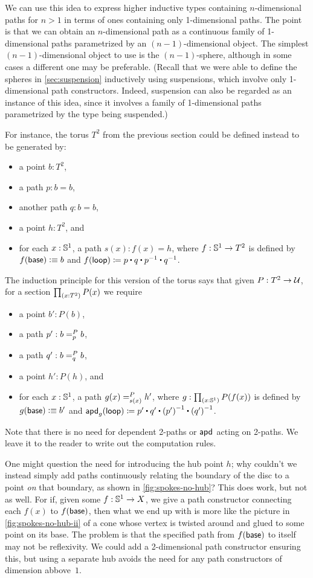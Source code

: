 We can use this idea to express higher inductive types containing $n$-dimensional paths for $n>1$ in terms of ones containing only 1-dimensional paths.
The point is that we can obtain an $n$-dimensional path as a continuous family of 1-dimensional paths parametrized by an $(n-1)$-dimensional object.
The simplest $(n-1)$-dimensional object to use is the $(n-1)$-sphere, although in some cases a different one may be preferable.
(Recall that we were able to define the spheres in \autoref{sec:suspension} inductively using suspensions, which involve only 1-dimensional path constructors.
Indeed, suspension can also be regarded as an instance of this idea, since it involves a family of 1-dimensional paths parametrized by the type being suspended.)

For instance, the torus $T^2$ from the previous section could be defined instead to be generated by:
\begin{itemize}
\item a point $b:T^2$,
\item a path $p:b=b$,
\item another path $q:b=b$,
\item a point $h:T^2$, and
\item for each $x:\Sn^1$, a path $s(x) : f(x)=h$, where $f:\Sn^1\to T^2$ is defined by $f(\base)\defeq b$ and $\ap f \lloop \defid p \ct q \ct \opp p \ct \opp q$.
\end{itemize}
The induction principle for this version of the torus says that given $P:T^2\to\type$, for a section $\prd{x:T^2} P(x)$ we require
\begin{itemize}
\item a point $b':P(b)$,
\item a path $p' : \dpath P p b b$,
\item a path $q' : \dpath P q b b$,
\item a point $h':P(h)$, and
\item for each $x:\Sn^1$, a path $\dpath {P}{s(x)}{g(x)}{h'}$, where $g:\prd{x:\Sn^1} P(f(x))$ is defined by $g(\base)\defeq b'$ and $\apd g \lloop \defid p' \ct q' \ct \opp{(p')} \ct \opp{(q')}$.
\end{itemize}
Note that there is no need for dependent 2-paths or $\apdfunc{}$ acting on 2-paths.
We leave it to the reader to write out the computation rules.

\begin{rmk}\label{rmk:spokes-no-hub}
One might question the need for introducing the hub point $h$; why couldn't we instead simply add paths continuously relating the boundary of the disc to a point \emph{on} that boundary, as shown in \autoref{fig:spokes-no-hub}?
This does work, but not as well.
For if, given some $f:\Sn^1 \to X$, we give a path constructor connecting each $f(x)$ to $f(\base)$, then what we end up with is more like the picture in \autoref{fig:spokes-no-hub-ii} of a cone whose vertex is twisted around and glued to some point on its base.
The problem is that the specified path from $f(\base)$ to itself may not be reflexivity.
We could add a 2-dimensional path constructor ensuring this, but using a separate hub avoids the need for any path constructors of dimension abbove~$1$.
\end{rmk}

